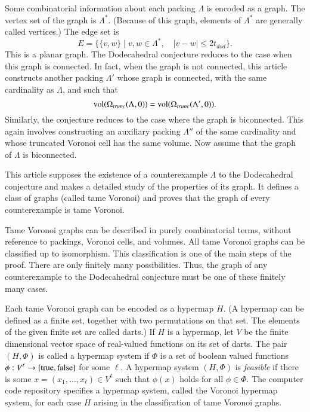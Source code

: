 \documentclass{article} %
\begin{document}
Some combinatorial information about each packing $\Lambda$ is encoded
as a  graph.  %
The vertex set of the graph is $\Lambda^*$.
(Because of this graph,  elements of $\Lambda^*$ are generally called vertices.)
The edge set is 
$$
E = \{\{v,w\} \mid v,w\in\Lambda^*,\quad   |v-w| \le 2t_{dod}\}.
$$
This is a planar graph.  
The Dodecahedral conjecture reduces to the case when this graph is connected.  In fact,
when the graph is not connected, this article constructs another packing
$\Lambda'$ whose graph is connected, with the same cardinality as $\Lambda$,
and such that
$$
{\operatorname{vol}}(\Omega_{trunc}(\Lambda,0)) = {\operatorname{vol}}(\Omega_{trunc}(\Lambda',0)). 
$$
Similarly, the conjecture reduces to the case where the graph is biconnected.
  This again involves constructing an auxiliary 
packing $\Lambda''$ of the same cardinality and whose  truncated Voronoi cell has the same volume.  Now assume that the graph of $\Lambda$ is 
biconnected.

This article supposes the existence of a counterexample $\Lambda$ to
the Dodecahedral conjecture and makes a detailed study of the
properties of its graph. It defines a class of graphs (called tame
Voronoi) and proves that the graph of every counterexample is tame
Voronoi.

Tame Voronoi graphs can be described in purely combinatorial terms,
without reference to packings, Voronoi cells, and volumes. All tame
Voronoi graphs can be classified up to isomorphism. This
classification is one of the main steps of the proof. There are only
finitely many possibilities. Thus, the graph of any counterexample to
the Dodecahedral conjecture must be one of these finitely many cases.

Each tame Voronoi graph can be encoded as a hypermap $H$. (A hypermap
can be defined as a finite set, together with two permutations on that
set. The elements of the given finite set are called darts.) If $H$ is
a hypermap, let $V$ be the finite dimensional vector space of
real-valued functions on its set of darts. The pair $(H,\Phi)$ is
called a hypermap system if $\Phi$ is a set of boolean valued
functions $\phi:V^\ell \to \{{\operatorname{true}},{\operatorname{false}}\}$ for some $\ell$.
A hypermap system $(H,\Phi)$ is {\it feasible} if there is some
$x=(x_1,\ldots,x_\ell)\in V^\ell$ such that $\phi(x)$ holds for all
$\phi\in\Phi$. The computer code repository specifies 
a hypermap system, called
the Voronoi hypermap system, for each case $H$ arising in the
classification of tame Voronoi graphs.
\end{document}
